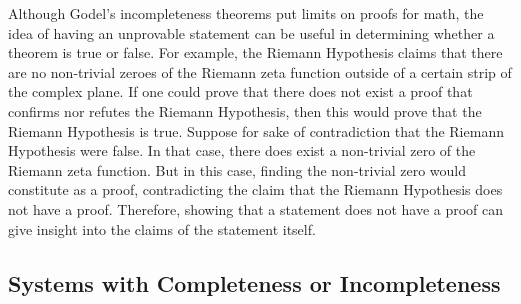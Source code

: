 \documentclass[%
 reprint,
 amsmath,amssymb,
 aps,
]{revtex4-2}
\begin{document}
Although Godel's incompleteness theorems put limits on proofs for math, the idea of having an unprovable statement can be useful in determining whether a theorem is true or false.  For example, the Riemann Hypothesis claims that there are no non-trivial zeroes of the Riemann zeta function outside of a certain strip of the complex plane.  If one could prove that there does not exist a proof that confirms nor refutes the Riemann Hypothesis, then this would prove that the Riemann Hypothesis is true.  Suppose for sake of contradiction that the Riemann Hypothesis were false.  In that case, there does exist a non-trivial zero of the Riemann zeta function.  But in this case, finding the non-trivial zero would constitute as a proof, contradicting the claim that the Riemann Hypothesis does not have a proof.  Therefore, showing that a statement does not have a proof can give insight into the claims of the statement itself.  

\subsection{Systems with Completeness or Incompleteness}
\end{document}
